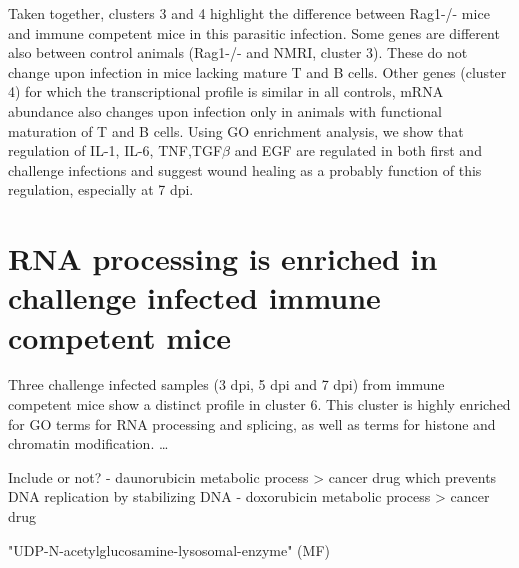 \documentclass{bmcart}
\begin{document}
Taken together, clusters 3 and 4 highlight the difference between Rag1-/- mice and immune competent mice in this parasitic infection. Some genes are different also between control animals (Rag1-/- and NMRI, cluster 3). These do not change upon infection in mice lacking mature T and B cells. Other genes (cluster 4) for which the transcriptional profile is similar in all controls, mRNA abundance also changes upon infection only in animals with functional maturation of T and B cells. Using GO enrichment analysis, we show that regulation of IL-1, IL-6, TNF,TGF$\beta$ and EGF are regulated in both first and challenge infections and suggest wound healing as a probably function of this regulation, especially at 7 dpi.
 
\section*{RNA processing is enriched in challenge infected immune competent mice} 
Three challenge infected samples (3 dpi, 5 dpi and 7 dpi) from immune competent mice show a distinct profile in cluster 6. This cluster is highly enriched for GO terms for RNA processing and splicing, as well as terms for histone and chromatin modification. \ldots

Include or not?
- daunorubicin metabolic process > cancer drug which prevents DNA replication by stabilizing DNA
- doxorubicin metabolic process  > cancer drug

 
"UDP-N-acetylglucosamine-lysosomal-enzyme" (MF)



\end{document}
